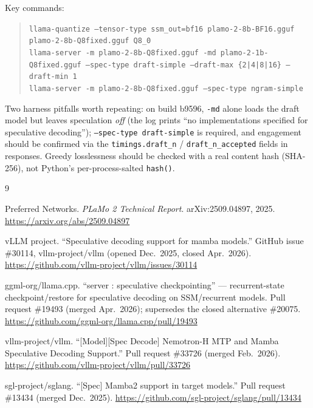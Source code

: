 \documentclass[10pt]{article}
\newcommand{\code}[1]{\texttt{#1}}
\begin{document}
Key commands:

\begin{quote}
\small
\code{llama-quantize --tensor-type ssm\_out=bf16 plamo-2-8b-BF16.gguf
plamo-2-8b-Q8fixed.gguf Q8\_0}\\[2pt]
\code{llama-server -m plamo-2-8b-Q8fixed.gguf -md plamo-2-1b-Q8fixed.gguf
--spec-type draft-simple --draft-max \{2|4|8|16\} --draft-min 1}\\[2pt]
\code{llama-server -m plamo-2-8b-Q8fixed.gguf --spec-type ngram-simple}
\end{quote}

Two harness pitfalls worth repeating: on build b9596, \code{-md} alone
loads the draft model but leaves speculation \emph{off} (the log prints
``no implementations specified for speculative decoding'');
\code{--spec-type draft-simple} is required, and engagement should be
confirmed via the \code{timings.draft\_n} / \code{draft\_n\_accepted}
fields in responses. Greedy losslessness should be checked with a real
content hash (SHA-256), not Python's per-process-salted \code{hash()}.

\begin{thebibliography}{9}

Preferred Networks.
\emph{PLaMo 2 Technical Report}.
arXiv:2509.04897, 2025.
\url{https://arxiv.org/abs/2509.04897}

vLLM project.
``Speculative decoding support for mamba models.''
GitHub issue \#30114, vllm-project/vllm (opened Dec.\ 2025, closed
Apr.\ 2026).
\url{https://github.com/vllm-project/vllm/issues/30114}

ggml-org/llama.cpp.
``server : speculative checkpointing'' --- recurrent-state
checkpoint/restore for speculative decoding on SSM/recurrent models.
Pull request \#19493 (merged Apr.\ 2026); supersedes the closed alternative
\#20075.
\url{https://github.com/ggml-org/llama.cpp/pull/19493}

vllm-project/vllm.
``[Model][Spec Decode] Nemotron-H MTP and Mamba Speculative Decoding
Support.'' Pull request \#33726 (merged Feb.\ 2026).
\url{https://github.com/vllm-project/vllm/pull/33726}

sgl-project/sglang.
``[Spec] Mamba2 support in target models.'' Pull request \#13434 (merged
Dec.\ 2025).
\url{https://github.com/sgl-project/sglang/pull/13434}

\end{thebibliography}
\end{document}
